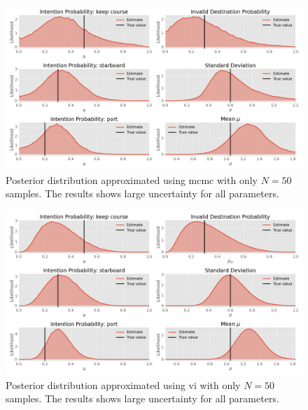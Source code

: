 \begin{figure}[h]
    \centering
    \includegraphics[width=\textwidth]{figures/example_mcmc_low_N.png}
    \caption{Posterior distribution approximated using \acrshort{mcmc} with only $N=50$ samples. The results shows large uncertainty for all parameters.}
    \label{fig:example_mcmc_low_N}
\end{figure}

\begin{figure}[h]
    \centering
    \includegraphics[width=\textwidth]{figures/example_vi_low_N.png}
    \caption{Posterior distribution approximated using \acrshort{vi} with only $N=50$ samples. The results shows large uncertainty for all parameters.}
    \label{fig:example_vi_low_N}
\end{figure}



